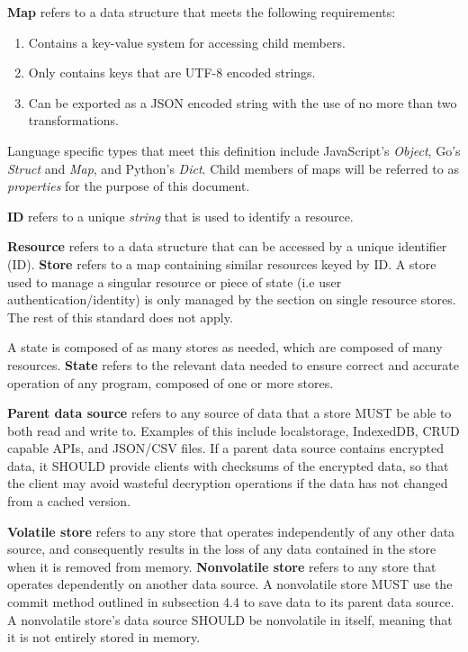 \documentclass{article}
\begin{document}
\textbf{Map} refers to a data structure that meets the following requirements:
\begin{enumerate}
    \item Contains a key-value system for accessing child members.
    \item Only contains keys that are UTF-8 encoded strings.
    \item Can be exported as a JSON encoded string with the use of no more than two transformations.
\end{enumerate}
Language specific types that meet this definition include JavaScript's \emph{Object}, Go's \emph{Struct} and \emph{Map}, and Python's \emph{Dict}. Child members of maps will be referred to as \emph{properties} for the purpose of this document.

\textbf{ID} refers to a unique \emph{string} that is used to identify a resource.

\textbf{Resource} refers to a data structure that can be accessed by a unique identifier (ID). \textbf{Store} refers to a map containing similar resources keyed by ID. A store used to manage a singular resource or piece of state (i.e user authentication/identity) is only managed by the section on single resource stores. The rest of this standard does not apply.

A state is composed of as many stores as needed, which are composed of many resources. \textbf{State} refers to the relevant data needed to ensure correct and accurate operation of any program, composed of one or more stores.

\textbf{Parent data source} refers to any source of data that a store MUST be able to both read and write to. Examples of this include localstorage, IndexedDB, CRUD capable APIs, and JSON/CSV files. If a parent data source contains encrypted data, it SHOULD provide clients with checksums of the encrypted data, so that the client may avoid wasteful decryption operations if the data has not changed from a cached version.

\textbf{Volatile store} refers to any store that operates independently of any other data source, and consequently results in the loss of any data contained in the store when it is removed from memory. \textbf{Nonvolatile store} refers to any store that operates dependently on another data source. A nonvolatile store MUST use the commit method outlined in subsection 4.4 to save data to its parent data source. A nonvolatile store's data source SHOULD be nonvolatile in itself, meaning that it is not entirely stored in memory.
\end{document}
